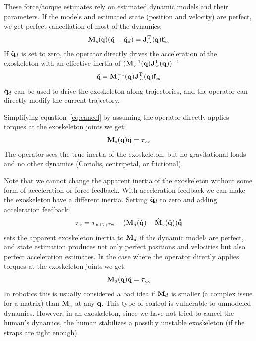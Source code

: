 \documentclass[letterpaper,12pt,fullpage]{article}
\newcommand{\myx}{{\mbox {\tiny x}}}
\newcommand{\ox}{{\mbox {\tiny ox}}}
\newcommand{\xinvdynw}{{\mbox {\tiny x-ID+Fw}}}
\begin{document}
These force/torque estimates rely on estimated dynamic models and their parameters.
If the models and estimated state (position and velocity) are perfect, we get
perfect cancellation of most of the dynamics:
\begin{equation}
\mM_{\myx}(\vq) (\ddot{\vq} - \ddot{\vq}_d) = \mJ_{\ox}^{\tr}(\vq) \vf_{\ox}
\end{equation}
If $\ddot{{\bf q}}_d$ is set to zero, the operator directly drives the acceleration
of the exoskeleton with an effective inertia of 
$(\mM^{-1}_{\myx}(\vq) \mJ_{\ox}^{\tr}(\vq))^{-1}$
\begin{equation}
\ddot{\vq} = \mM^{-1}_{\myx}(\vq) \mJ_{\ox}^{\tr}(\vq) \vf_{\ox}
\label{eq:cancel}
\end{equation}
$\ddot{{\bf q}}_d$ can be used to drive the exoskeleton along trajectories, and
the operator can directly modify the current trajectory.

Simplifying equation~\ref{eq:cancel} by 
assuming the operator directly applies torques at the
exoskeleton joints we get:
\begin{equation}
\mM_{\myx} (\vq) \ddot{\vq} = \vtau_{\ox}
\end{equation}
The operator sees the true inertia of the exoskeleton, but no gravitational
loads and no other dynamics (Coriolis, centripetal, or frictional).

Note that we cannot change the apparent inertia of the exoskeleton without
some form of acceleration or force feedback.
With acceleration feedback we can make the exoskeleton have a different inertia.
Setting $\ddot{{\bf q}}_d$ to zero and adding acceleration feedback:
\begin{equation}
\vtau_{\myx} = \vtau_{\xinvdynw} - (\mM_d(\hat{\vq}) - \hat{\mM}_{\myx}(\hat{\vq})) \hat{\ddot{\vq}}
\label{eq:change-inertia1}
\end{equation}
sets the apparent exoskeleton inertia to ${\bf M}_d$ if the dynamic models are perfect, and
state estimation produces not only perfect positions and velocities but
also perfect acceleration estimates. In the case 
where the operator directly applies torques at the
exoskeleton joints we get:
\begin{equation}
\mM_d (\vq) \ddot{\vq} = \vtau_{\ox}
\end{equation}
In robotics this is usually considered a bad idea if ${\bf M}_d$ is smaller (a complex
issue for a matrix) than $\mM_{\myx}$ at any ${\bf q}$. This type of control is vulnerable
to unmodeled dynamics. However, in an exoskeleton, since we have not tried to
cancel the human's dynamics, the human stabilizes a possibly unstable exoskeleton
(if the straps are tight enough).
\end{document}
